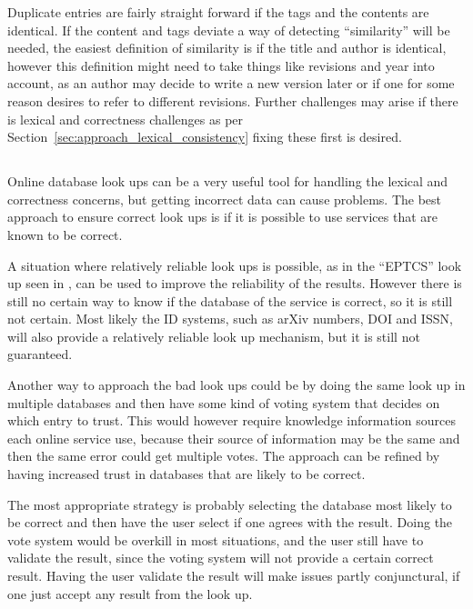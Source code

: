 Duplicate entries are fairly straight forward if the tags and the
contents are identical.  If the content and tags deviate a way of
detecting ``similarity'' will be needed, the easiest definition of
similarity is if the title and author is identical, however this
definition might need to take things like revisions and year into
account, as an author may decide to write a new version later or if
one for some reason desires to refer to different revisions.  Further
challenges may arise if there is lexical and correctness challenges as
per Section~\ref{sec:approach_lexical_consistency} fixing these first
is desired.


\subsection{}
\label{sec:approach_look_ups}

Online database look ups can be a very useful tool for handling the
lexical and correctness concerns, but getting incorrect data can cause
problems.  The best approach to ensure correct look ups is if it is
possible to use services that are known to be correct.

A situation where relatively reliable look ups is possible, as in the
``EPTCS'' look up seen in , can be used to
improve the reliability of the results.  However there is still no
certain way to know if the database of the service is correct, so it
is still not certain.  Most likely the ID systems, such as arXiv
numbers, DOI and ISSN, will also provide a relatively reliable look up
mechanism, but it is still not guaranteed.

Another way to approach the bad look ups could be by doing the same
look up in multiple databases and then have some kind of voting system
that decides on which entry to trust.  This would however require
knowledge information sources each online service use, because their
source of information may be the same and then the same error could
get multiple votes.  The approach can be refined by having increased
trust in databases that are likely to be correct.

The most appropriate strategy is probably selecting the database most
likely to be correct and then have the user select if one agrees with
the result.  Doing the vote system would be overkill in most
situations, and the user still have to validate the result, since the
voting system will not provide a certain correct result.  Having the
user validate the result will make issues partly conjunctural, if one
just accept any result from the look up.


